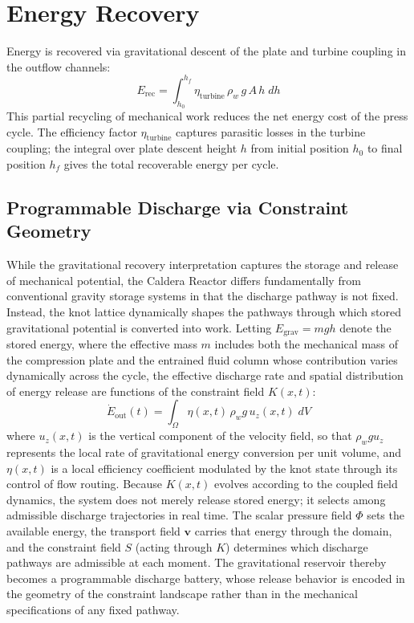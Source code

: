 \documentclass[12pt, a4paper]{article}
\begin{document}
\section{Energy Recovery}

Energy is recovered via gravitational descent of the plate and turbine coupling in the outflow channels:
\[
E_{\text{rec}} = \int_{h_0}^{h_f} \eta_{\text{turbine}}\, \rho_w\, g\, A\, h\; dh
\]
This partial recycling of mechanical work reduces the net energy cost of the press cycle. The efficiency factor $\eta_{\text{turbine}}$ captures parasitic losses in the turbine coupling; the integral over plate descent height $h$ from initial position $h_0$ to final position $h_f$ gives the total recoverable energy per cycle.

\subsection{Programmable Discharge via Constraint Geometry}

While the gravitational recovery interpretation captures the storage and release of mechanical potential, the Caldera Reactor differs fundamentally from conventional gravity storage systems in that the discharge pathway is not fixed. Instead, the knot lattice dynamically shapes the pathways through which stored gravitational potential is converted into work. Letting $E_{\text{grav}} = mgh$ denote the stored energy, where the effective mass $m$ includes both the mechanical mass of the compression plate and the entrained fluid column whose contribution varies dynamically across the cycle, the effective discharge rate and spatial distribution of energy release are functions of the constraint field $K(x,t)$:
\[
\dot{E}_{\text{out}}(t) = \int_{\Omega} \eta(x,t)\, \rho_w g\, u_z(x,t)\; dV
\]
where $u_z(x,t)$ is the vertical component of the velocity field, so that $\rho_w g u_z$ represents the local rate of gravitational energy conversion per unit volume, and $\eta(x,t)$ is a local efficiency coefficient modulated by the knot state through its control of flow routing. Because $K(x,t)$ evolves according to the coupled field dynamics, the system does not merely release stored energy; it selects among admissible discharge trajectories in real time. The scalar pressure field $\Phi$ sets the available energy, the transport field $\mathbf{v}$ carries that energy through the domain, and the constraint field $S$ (acting through $K$) determines which discharge pathways are admissible at each moment. The gravitational reservoir thereby becomes a programmable discharge battery, whose release behavior is encoded in the geometry of the constraint landscape rather than in the mechanical specifications of any fixed pathway.
\end{document}
